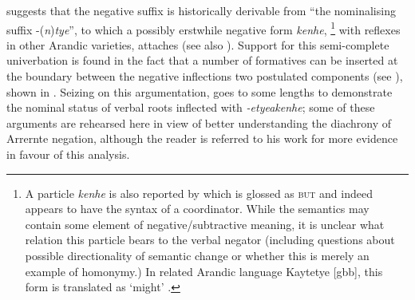 \documentclass[output=paper]{langsci/langscibook}
\begin{document}
    \iffalse\begin{exe}
\ex Anwerne itele\textdblhyphen{ar}-etye\textdblhyphen{kwenye}
    \end{exe}\fi

\citet[235, fn 17]{Wilkins1989} suggests that the negative suffix is
    historically derivable from ``the nominalising suffix
    -(\textit{n})\textit{tye}'', to which a possibly erstwhile negative
    form \textit{kenhe},%
\footnote{A particle \textit{kenhe} is also reported by
    \citet[372]{Wilkins1989} which is glossed as \textsc{but} and indeed
    appears to have the syntax of a coordinator. While the semantics may
    contain some element of negative\slash subtractive meaning, it is
    unclear what relation this particle bears to the verbal negator
    (including questions about possible directionality of semantic change
    or whether this is merely an example of homonymy.) In related Arandic
    language Kaytetye [gbb], this form is translated as `might'
    \citep[424]{KaytetyeDict}.}
with reflexes in other Arandic varieties, attaches (see also
    \citealt[275]{Yallop1977}). Support for this semi-complete univerbation
    is found in the fact that a number of formatives can be inserted at the
    boundary between the negative inflections two postulated components
    (see \citealt[378ff]{Wilkins1989}), shown in
    . Seizing on this argumentation, \citet[411-26]{Henderson2013} goes to some lengths to demonstrate the nominal status of verbal roots inflected with \textit{-etye\textdblhyphen akenhe}; some of these arguments are rehearsed here in view of better understanding the diachrony of Arrernte negation, although the reader is referred to his work for more evidence in favour of this analysis.
%
\end{document}
